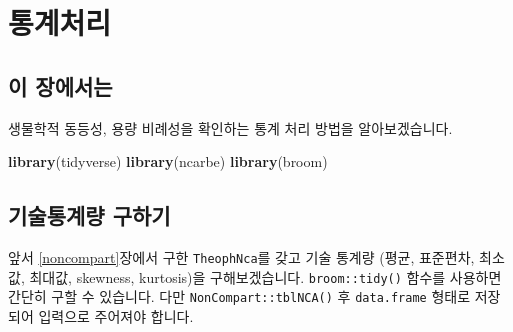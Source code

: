 \documentclass[12pt,]{krantz}
\newenvironment{Shaded}{\begin{snugshade}}{\end{snugshade}}
\newcommand{\KeywordTok}[1]{\textcolor[rgb]{0.13,0.29,0.53}{\textbf{#1}}}
\newcommand{\DataTypeTok}[1]{\textcolor[rgb]{0.13,0.29,0.53}{#1}}
\newcommand{\DecValTok}[1]{\textcolor[rgb]{0.00,0.00,0.81}{#1}}
\newcommand{\StringTok}[1]{\textcolor[rgb]{0.31,0.60,0.02}{#1}}
\newcommand{\OtherTok}[1]{\textcolor[rgb]{0.56,0.35,0.01}{#1}}
\newcommand{\OperatorTok}[1]{\textcolor[rgb]{0.81,0.36,0.00}{\textbf{#1}}}
\newcommand{\NormalTok}[1]{#1}
\theoremstyle{definition}
\theoremstyle{definition}
\theoremstyle{definition}
\theoremstyle{remark}
\begin{document}
\chapter{통계처리}\label{statistics}

\section{이 장에서는}\label{stat-intro}

생물학적 동등성, 용량 비례성을 확인하는 통계 처리 방법을 알아보겠습니다.

\begin{Shaded}
\begin{Highlighting}[]
\KeywordTok{library}\NormalTok{(tidyverse)}
\KeywordTok{library}\NormalTok{(ncarbe)}
\KeywordTok{library}\NormalTok{(broom)}
\end{Highlighting}
\end{Shaded}

\section{기술통계량 구하기}\label{-}

앞서 \ref{noncompart}장에서 구한 \texttt{TheophNca}를 갖고 기술 통계량
(평균, 표준편차, 최소값, 최대값, skewness, kurtosis)을 구해보겠습니다.
\texttt{broom::tidy()} 함수를 사용하면 간단히 구할 수 있습니다. 다만
\texttt{NonCompart::tblNCA()} 후 \texttt{data.frame} 형태로 저장되어
입력으로 주어져야 합니다.

\begin{Shaded}
\end{Shaded}
\end{document}
